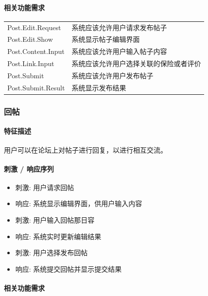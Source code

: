 \documentclass[a4paper]{ctexart}
\begin{document}
\paragraph{相关功能需求}

\begin{center}
    \begin{tabular}{p{6cm}|p{8cm}}
      \toprule
      Post.Edit.Request & 系统应该允许用户请求发布帖子 \\
      Post.Edit.Show & 系统显示帖子编辑界面     \\
      \midrule
      Post.Content.Input & 系统应该允许用户输入帖子内容\\
      \midrule
      Post.Link.Input & 系统应该允许用户选择关联的保险或者评价 \\
      \midrule
      Post.Submit & 系统应该允许用户发布帖子 \\
      Post.Submit.Result & 系统显示发布结果 \\
      \bottomrule
    \end{tabular}
\end{center}

\subsubsection{回帖}

\paragraph{特征描述}
用户可以在论坛上对帖子进行回复，以进行相互交流。

\paragraph{刺激 / 响应序列}

\begin{itemize}
  \item 刺激: 用户请求回帖
  \item 响应: 系统显示编辑界面，供用户输入内容
  \item 刺激: 用户输入回帖那日容
  \item 响应: 系统实时更新编辑结果
  \item 刺激: 用户选择发布回帖
  \item 响应: 系统提交回帖并显示提交结果
\end{itemize}

\paragraph{相关功能需求}
\end{document}
